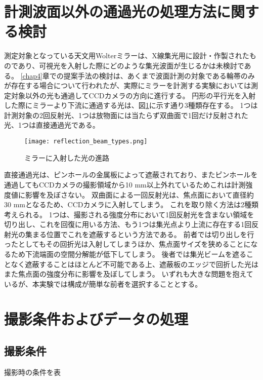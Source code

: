 \section{計測波面以外の通過光の処理方法に関する検討}
測定対象となっている天文用Wolterミラーは、X線集光用に設計・作製されたものであり、可視光を入射した際にどのような集光波面が生じるかは未検討である。
\ref{chap4}章での提案手法の検討は、あくまで波面計測の対象である輪帯のみが存在する場合について行われたが、実際にミラーを計測する実験においては測定対象以外の光も通過してCCDカメラの方向に進行する。
円形の平行光を入射した際にミラーより下流に通過する光は、図\ref{fig:mirror_beam_path_types}に示す通り3種類存在する。
1つは計測対象の2回反射光、1つは放物面には当たらず双曲面で1回だけ反射された光、1つは直接通過光である。

\begin{figure}[!ht]
\centering
\texttt{[image: reflection\_beam\_types.png]}
\caption{ミラーに入射した光の進路}
\label{fig:mirror_beam_path_types}
\end{figure}

直接通過光は、ピンホールの金属板によって遮蔽されており、またピンホールを通過してもCCDカメラの撮影領域から10 mm以上外れているためこれは計測強度値に影響を及ぼさない。
双曲面による一回反射光は、焦点面において直径約30 mmとなるため、CCDカメラに入射してしまう。
これを取り除く方法は2種類考えられる。
1つは、撮影される強度分布において1回反射光を含まない領域を切り出し、これを回復に用いる方法、もう1つは集光点より上流に存在する1回反射光の集まる位置でこれを遮蔽するという方法である。
前者では切り出しを行ったとしてもその回折光は入射してしまうほか、焦点面サイズを狭めることになるため下流端面の空間分解能が低下してしまう。
後者では集光ビームを遮ることなく遮蔽することはほとんど不可能である上、遮蔽板のエッジで回折した光はまた焦点面の強度分布に影響を及ぼしてしまう。
いずれも大きな問題を抱えているが、本実験では構成が簡単な前者を選択することとする。


\clearpage
\newpage

\section{撮影条件およびデータの処理}

\subsection{撮影条件}
撮影時の条件を表

